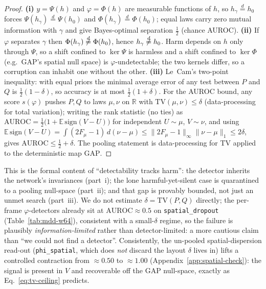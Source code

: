 ﻿\documentclass{article} %
\theoremstyle{remark}
\begin{document}
\begin{proof}
\textbf{(i)} $y=\Psi(h)$ and $\varphi=\Phi(h)$ are measurable functions of $h$, so
$h_\gamma\overset{d}{=}h_0$ forces $\Psi(h_\gamma)\overset{d}{=}\Psi(h_0)$ and
$\Phi(h_\gamma)\overset{d}{=}\Phi(h_0)$; equal laws carry zero mutual information with $\gamma$ and
give Bayes-optimal separation $\tfrac12$ (chance AUROC).
\textbf{(ii)} If $\varphi$ separates $\gamma$ then $\Phi(h_\gamma)\not\overset{d}{=}\Phi(h_0)$, hence
$h_\gamma\not\overset{d}{=}h_0$. Harm depends on $h$ only through $\Psi$, so a shift confined to
$\ker\Psi$ is harmless and a shift confined to $\ker\Phi$ (e.g.\ GAP's spatial null space) is
$\varphi$-undetectable; the two kernels differ, so a corruption can inhabit one without the other.
\textbf{(iii)} Le~Cam's two-point inequality: with equal priors the minimal average error of any
test between $P$ and $Q$ is $\tfrac12(1-\delta)$, so accuracy is at most $\tfrac12(1+\delta)$. For
the AUROC bound, any score $s(\varphi)$ pushes $P,Q$ to laws $\mu,\nu$ on $\mathbb{R}$ with
$\mathrm{TV}(\mu,\nu)\le\delta$ (data-processing for total variation); writing the rank statistic (no
ties) as $\mathrm{AUROC}=\tfrac12\bigl(1+\mathbb{E}\,\mathrm{sign}(V-U)\bigr)$ for independent
$U\sim\mu$, $V\sim\nu$, and using
$\mathbb{E}\,\mathrm{sign}(V-U)=\int(2F_\mu-1)\,d(\nu-\mu)\le\|2F_\mu-1\|_\infty\|\nu-\mu\|_1\le2\delta$,
gives $\mathrm{AUROC}\le\tfrac12+\delta$. The pooling statement is data-processing for TV applied to
the deterministic map $\mathrm{GAP}$.
\end{proof}
\noindent This is the formal content of ``detectability tracks harm'': the detector inherits the
network's invariances (part~i); the lone harmful-yet-silent case is quarantined to a pooling
null-space (part~ii); and that gap is provably bounded, not just an unmet search (part~iii). We do
not estimate $\delta=\mathrm{TV}(P,Q)$ directly; the per-frame $\varphi$-detectors already sit at
$\mathrm{AUROC}\approx0.5$ on \texttt{spatial\_dropout} (Table~\ref{tab:mdd-w64}), consistent with a
small-$\delta$ regime, so the failure is plausibly \emph{information-limited} rather than
detector-limited: a more cautious claim than ``we could not find a detector''. Consistently, the
un-pooled spatial-dispersion read-out (\texttt{phi\_spatial}, which does \emph{not} discard the
layout $\delta$ lives in) lifts a controlled contraction from $\approx0.50$ to $\approx1.00$
(Appendix~\ref{app:spatial-check}): the signal is present in $V$ and recoverable off the GAP
null-space, exactly as Eq.~\eqref{eq:tv-ceiling} predicts.
\end{document}

